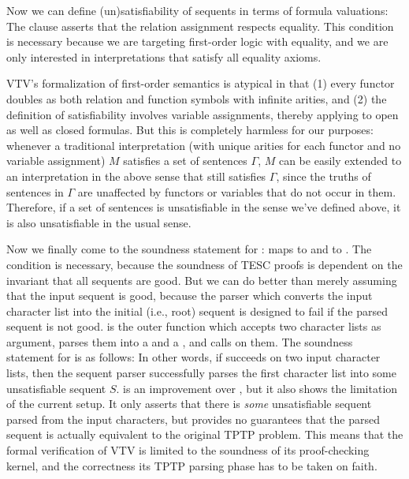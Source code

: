 \documentclass[12pt]{article}
\begin{document}
Now we can define (un)satisfiability of sequents in terms of formula valuations: 
The \AgdaSpace{} clause asserts that the
relation assignment  respects equality. This condition is necessary
because we are targeting first-order logic with equality, and we are only 
interested in interpretations that satisfy all equality axioms.

VTV's formalization of first-order semantics is atypical in that (1) every functor
doubles as both relation and function symbols with infinite arities, and 
(2) the definition of satisfiability involves variable assignments, thereby applying to
open as well as closed formulas. But this is completely harmless for our purposes:
whenever a traditional interpretation (with unique arities for each functor and no 
variable assignment) $M$ satisfies a set of sentences $\Gamma$, $M$ can be easily extended 
to an interpretation in the above sense that still satisfies $\Gamma$, since the 
truths of sentences in $\Gamma$ are unaffected by functors or variables that do not 
occur in them. Therefore, if a set of sentences is unsatisfiable in the sense we've
defined above, it is also unsatisfiable in the usual sense. 

Now we finally come to the soundness statement for :
 \AgdaSymbol{:}    
maps  to  and  to .
The condition \AgdaSpace{} is necessary, because 
the soundness of TESC proofs is dependent on the invariant that all sequents are good. 
But we can do better than merely assuming that the input sequent is good,
because the parser which converts the input character list into the initial (i.e., root) 
sequent is designed to fail if the parsed sequent is not good. 
is the outer function which accepts two character lists as argument, parses them 
into a  and a , and calls 
on them. The soundness statement for  is as follows:
In other words, if  succeeds on two input character lists, 
then the sequent parser successfully parses the first character list into some unsatisfiable 
sequent $S$.  is an improvement over ,
but it also shows the limitation of the current setup. It only asserts that there is 
\textit{some} unsatisfiable sequent parsed from the input characters, 
but provides no guarantees that the parsed sequent is actually equivalent to the original
TPTP problem. This means that the formal verification of VTV is limited to the soundness 
of its proof-checking kernel, and the correctness its TPTP parsing phase has to be 
taken on faith.
\end{document}
